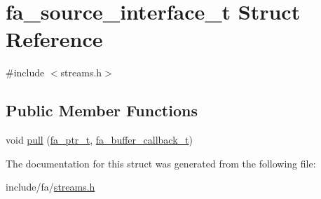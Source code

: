 \hypertarget{structfa__source__interface__t}{\section{fa\-\_\-source\-\_\-interface\-\_\-t Struct Reference}
\label{structfa__source__interface__t}
}


{\ttfamily \#include $<$streams.\-h$>$}

\subsection*{Public Member Functions}
\begin{DoxyCompactItemize}
\item 
void \hyperlink{group___fa_gab8801d3728ea6eb99015309cfc73ae0e}{pull} (\hyperlink{group___fa_ga915ddeae99ad7568b273d2b876425197}{fa\-\_\-ptr\-\_\-t}, \hyperlink{group___fa_streams_ga9f9c29b1d06e16f886e1458cbf3d827f}{fa\-\_\-buffer\-\_\-callback\-\_\-t})
\end{DoxyCompactItemize}


The documentation for this struct was generated from the following file\-:\begin{DoxyCompactItemize}
\item 
include/fa/\hyperlink{streams_8h}{streams.\-h}\end{DoxyCompactItemize}
